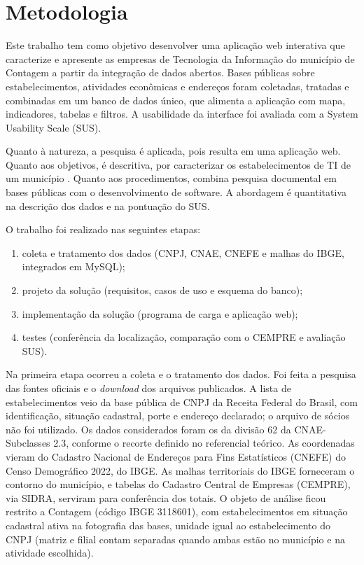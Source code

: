 \section{Metodologia}

Este trabalho tem como objetivo desenvolver uma aplicação web interativa que caracterize e apresente as empresas de Tecnologia da Informação do município de Contagem a partir da integração de dados abertos.
Bases públicas sobre estabelecimentos, atividades econômicas e endereços foram coletadas, tratadas e combinadas em um banco de dados único, que alimenta a aplicação com mapa, indicadores, tabelas e filtros.
A usabilidade da interface foi avaliada com a System Usability Scale (SUS).

Quanto à natureza, a pesquisa é aplicada, pois resulta em uma aplicação web.
Quanto aos objetivos, é descritiva, por caracterizar os estabelecimentos de TI de um município \cite{gil2008}.
Quanto aos procedimentos, combina pesquisa documental em bases públicas com o desenvolvimento de software.
A abordagem é quantitativa na descrição dos dados e na pontuação do SUS.

O trabalho foi realizado nas seguintes etapas:

\begin{enumerate}
    \item coleta e tratamento dos dados (CNPJ, CNAE, CNEFE e malhas do IBGE, integrados em MySQL);
    \item projeto da solução (requisitos, casos de uso e esquema do banco);
    \item implementação da solução (programa de carga e aplicação web);
    \item testes (conferência da localização, comparação com o CEMPRE e avaliação SUS).
\end{enumerate}

Na primeira etapa ocorreu a coleta e o tratamento dos dados.
Foi feita a pesquisa das fontes oficiais e o \textit{download} dos arquivos publicados.
A lista de estabelecimentos veio da base pública de CNPJ da Receita Federal do Brasil, com identificação, situação cadastral, porte e endereço declarado; o arquivo de sócios não foi utilizado.
Os dados considerados foram os da divisão 62 da CNAE-Subclasses 2.3, conforme o recorte definido no referencial teórico.
As coordenadas vieram do Cadastro Nacional de Endereços para Fins Estatísticos (CNEFE) do Censo Demográfico 2022, do IBGE.
As malhas territoriais do IBGE forneceram o contorno do município, e tabelas do Cadastro Central de Empresas (CEMPRE), via SIDRA, serviram para conferência dos totais.
O objeto de análise ficou restrito a Contagem (código IBGE 3118601), com estabelecimentos em situação cadastral ativa na fotografia das bases, unidade igual ao estabelecimento do CNPJ (matriz e filial contam separadas quando ambas estão no município e na atividade escolhida).

